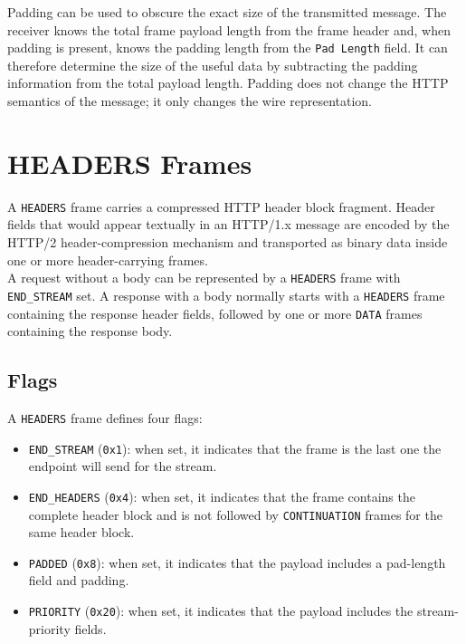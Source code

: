 \documentclass{scrbook}
\begin{document}
Padding can be used to obscure the exact size of the transmitted message. The receiver knows the total frame payload length from the frame header and, when padding is present, knows the padding length from the \texttt{Pad Length} field. It can therefore determine the size of the useful data by subtracting the padding information from the total payload length. Padding does not change the HTTP semantics of the message; it only changes the wire representation.

\section{HEADERS Frames}

A \texttt{HEADERS} frame carries a compressed HTTP header block fragment. Header fields that would appear textually in an HTTP/1.x message are encoded by the HTTP/2 header-compression mechanism and transported as binary data inside one or more header-carrying frames.\\

A request without a body can be represented by a \texttt{HEADERS} frame with \texttt{END\_STREAM} set. A response with a body normally starts with a \texttt{HEADERS} frame containing the response header fields, followed by one or more \texttt{DATA} frames containing the response body.

\subsection{Flags}

A \texttt{HEADERS} frame defines four flags:

\begin{itemize}
    \item \texttt{END\_STREAM} (\texttt{0x1}): when set, it indicates that the frame is the last one the endpoint will send for the stream.
    \item \texttt{END\_HEADERS} (\texttt{0x4}): when set, it indicates that the frame contains the complete header block and is not followed by \texttt{CONTINUATION} frames for the same header block.
    \item \texttt{PADDED} (\texttt{0x8}): when set, it indicates that the payload includes a pad-length field and padding.
    \item \texttt{PRIORITY} (\texttt{0x20}): when set, it indicates that the payload includes the stream-priority fields.
\end{itemize}
\end{document}
